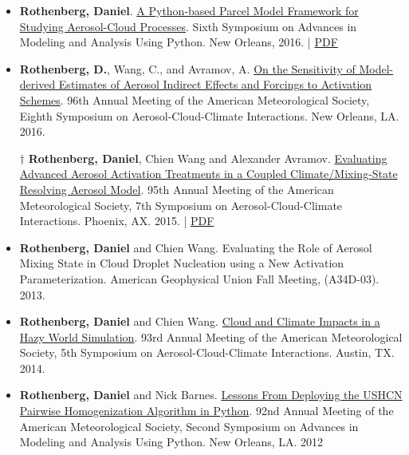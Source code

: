 \documentclass[11pt,letterpaper]{article}
\begin{document}
\begin{itemize}[itemindent=-10pt]
 \item \textbf{Rothenberg, Daniel}. \href{https://ams.confex.com/ams/96Annual/webprogram/Paper286193.html}{A Python-based Parcel Model Framework for Studying Aerosol-Cloud Processes}. Sixth Symposium on Advances in Modeling and Analysis Using Python. New Orleans, 2016. | \href{https://figshare.com/articles/A_Python-based_Parcel_Model_Framework_for_Studying_Aerosol-Cloud_Processes/3475241}{PDF}

 \item \textbf{Rothenberg, D.}, Wang, C., and Avramov, A. \href{https://ams.confex.com/ams/96Annual/webprogram/Paper289914.html}{On the Sensitivity of Model-derived Estimates of Aerosol Indirect Effects and Forcings to Activation Schemes}. 96th Annual Meeting of the American Meteorological Society, Eighth Symposium on Aerosol-Cloud-Climate Interactions. New Orleans, LA. 2016.

 \item[$\dagger$] \textbf{Rothenberg, Daniel}, Chien Wang and Alexander Avramov. \href{https://ams.confex.com/ams/95Annual/webprogram/Paper268747.html}{Evaluating Advanced Aerosol Activation Treatments in a Coupled Climate/Mixing-State Resolving Aerosol Model}. 95th Annual Meeting of the American Meteorological Society, 7th Symposium on Aerosol-Cloud-Climate Interactions. Phoenix, AX. 2015. | \href{https://figshare.com/articles/Evaluating_Advanced_Aerosol_Activation_Treatments_in_a_Coupled_Climate_Mixing-State_Resolving_Aerosol_Model/3475226}{PDF}

 \item \textbf{Rothenberg, Daniel} and Chien Wang. Evaluating the Role of Aerosol Mixing State in Cloud Droplet Nucleation using a New Activation Parameterization. American Geophysical Union Fall Meeting, (A34D-03). 2013.

 \item \textbf{Rothenberg, Daniel} and Chien Wang. \href{http://figshare.com/articles/AMS_2014_Evaluating_the_Role_of_Aerosol_Mixing_State_in_Cloud_Droplet_Nucleation_towards_Developing_a_New_Activation_Parameterization/918655}{Cloud and Climate Impacts in a Hazy World Simulation}. 93rd Annual Meeting of the American Meteorological Society, 5th Symposium on Aerosol-Cloud-Climate Interactions. Austin, TX. 2014.

 \item \textbf{Rothenberg, Daniel} and Nick Barnes. \href{https://ams.confex.com/ams/92Annual/webprogram/Paper198219.html}{Lessons From Deploying the USHCN Pairwise Homogenization Algorithm in Python}. 92nd Annual Meeting of the American Meteorological Society, Second Symposium on Advances in Modeling and Analysis Using Python. New Orleans, LA. 2012
\end{itemize}
\end{document}
